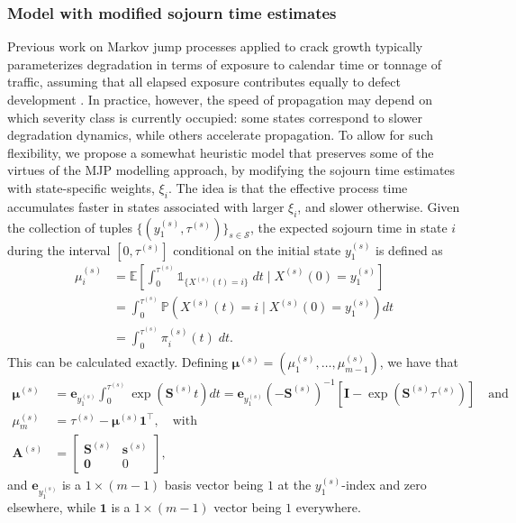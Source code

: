 \documentclass{article}
\begin{document}
\subsubsection{Model with modified sojourn time estimates} \label{sec:warping}
Previous work on Markov jump processes applied to crack growth typically parameterizes degradation in terms of exposure to calendar time or tonnage of traffic, assuming that all elapsed exposure contributes equally to defect development \citep{bisgaard2024A}. 
In practice, however, the speed of propagation may depend on which severity class is currently occupied: some states correspond to slower degradation dynamics, while others accelerate propagation.
To allow for such flexibility, we propose a somewhat heuristic model that preserves some of the virtues of the MJP modelling approach, by modifying the sojourn time estimates with state-specific weights, $\xi_i$.
The idea is that the effective process time accumulates faster in states associated with larger $\xi_i$, and slower otherwise.
Given the collection of tuples $\{ ( y_1^{(s)}, \tau^{(s)} ) \}_{s \in \mathcal{S}}$, the expected sojourn time in state $i$ during the interval $\left[ 0,\tau^{(s)} \right]$ conditional on the initial state $y_1^{(s)}$ is defined as
\begin{equation*}
    \begin{aligned}
    \mu_i^{(s)} &=\mathbb{E} \left[ \left. \int_0^{\tau^{(s)}} \mathds{1}_{\{X^{(s)}(t) = i\}} \; dt \; \Big| \; X^{(s)}(0) = y_1^{(s)} \right. \right] \\ 
				&= \int_0^{\tau^{(s)}}\mathds{P}\left(X^{(s)}(t)=i \; \Big| \; X^{(s)}(0)=y_1^{(s)}\right)dt \\ 
				&= \int_0^{\tau^{(s)}} \pi^{(s)}_i(t) \; dt.
\end{aligned}  \label{eq:cumulative_sojourn_time}
\end{equation*} 
This can be calculated exactly. Defining $\bm{\mu}^{(s)}  =  \left(\mu_1^{(s)},\dots,\mu_{m-1}^{(s)}\right)$, we have that
\begin{equation}
    \begin{aligned}
\bm{\mu}^{(s)} &= \bm{e}_{y_{1}^{(s)}} \int_0^{\tau^{(s)}}\exp\left(\bm{S}^{(s)}t\right) dt = \bm{e}_{y_{1}^{(s)}} (-\bm{S}^{(s)})^{-1}\left[\bm{I} - \exp \left( \bm{S}^{(s)}\tau^{(s)} \right) \right] \quad \text{and} \\ 
\mu_m^{(s)}  &= \tau^{(s)} - \bm{\mu}^{(s)}\bm{1}^\top, \quad \text{with} \\
\bm{A}^{(s)} &= \left[\begin{array}{cc} \bm{S}^{(s)} & \bm{s}^{(s)}\\
\bm{0} & 0\end{array}\right], 
    \end{aligned} \label{eq:sojourn_time_estimate}
\end{equation}
and $\bm{e}_{y_{1}^{(s)}}$ is a $1 \times (m-1)$ basis vector being $1$ at the $y_{1}^{(s)}$-index and zero elsewhere, while $\bm{1}$ is a $1 \times (m-1)$ vector being $1$ everywhere.
\end{document}
